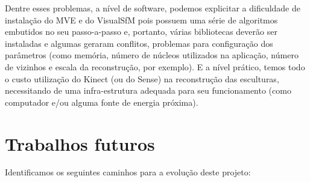 Dentre esses problemas, a nível de software, podemos explicitar a dificuldade de instalação do MVE e do VisualSfM pois possuem uma série de algoritmos embutidos no seu passo-a-passo e, portanto, várias bibliotecas deverão ser instaladas e algumas geraram conflitos, problemas para configuração dos parâmetros (como memória, número de núcleos utilizados na aplicação, número de vizinhos e escala da reconstrução, por exemplo). E a nível prático, temos todo o custo utilização do Kinect (ou do Sense) na reconstrução das esculturas, necessitando de uma infra-estrutura adequada para seu funcionamento (como computador e/ou alguma fonte de energia próxima).

\section{Trabalhos futuros} Identificamos os seguintes caminhos para a evolução deste projeto:
